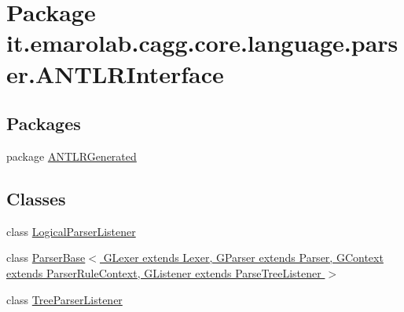 \hypertarget{namespaceit_1_1emarolab_1_1cagg_1_1core_1_1language_1_1parser_1_1ANTLRInterface}{\section{Package it.\-emarolab.\-cagg.\-core.\-language.\-parser.\-A\-N\-T\-L\-R\-Interface}
\label{namespaceit_1_1emarolab_1_1cagg_1_1core_1_1language_1_1parser_1_1ANTLRInterface}
}
\subsection*{Packages}
\begin{DoxyCompactItemize}
\item 
package \hyperlink{namespaceit_1_1emarolab_1_1cagg_1_1core_1_1language_1_1parser_1_1ANTLRInterface_1_1ANTLRGenerated}{A\-N\-T\-L\-R\-Generated}
\end{DoxyCompactItemize}
\subsection*{Classes}
\begin{DoxyCompactItemize}
\item 
class \hyperlink{classit_1_1emarolab_1_1cagg_1_1core_1_1language_1_1parser_1_1ANTLRInterface_1_1LogicalParserListener}{Logical\-Parser\-Listener}
\item 
class \hyperlink{classit_1_1emarolab_1_1cagg_1_1core_1_1language_1_1parser_1_1ANTLRInterface_1_1ParserBase_3_01GL50c14717389f32c0d6ed45a3d8ee0386}{Parser\-Base$<$ G\-Lexer extends Lexer, G\-Parser extends Parser, G\-Context extends Parser\-Rule\-Context, G\-Listener extends Parse\-Tree\-Listener $>$}
\item 
class \hyperlink{classit_1_1emarolab_1_1cagg_1_1core_1_1language_1_1parser_1_1ANTLRInterface_1_1TreeParserListener}{Tree\-Parser\-Listener}
\end{DoxyCompactItemize}
